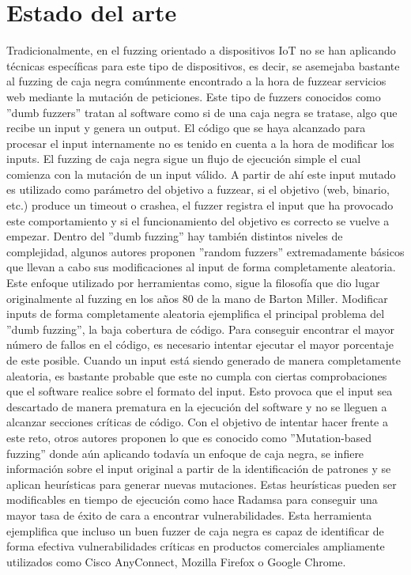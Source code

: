 \chapter{Estado del arte}
\label{estado_del_arte}
Tradicionalmente, en el fuzzing orientado a dispositivos IoT no se han aplicando técnicas
específicas para este tipo de dispositivos, es decir, se asemejaba bastante al fuzzing de caja negra 
comúnmente encontrado a la hora de fuzzear servicios web mediante la mutación de peticiones.
Este tipo de fuzzers conocidos como ''dumb fuzzers'' tratan al software como si de una caja negra se tratase, 
algo que recibe un input y genera un output. El código que se haya alcanzado para procesar el input internamente no es tenido en
cuenta a la hora de modificar los inputs. El fuzzing de caja negra sigue un flujo de ejecución simple el 
cual comienza con la mutación de un input válido.
A partir de ahí este input mutado es utilizado como parámetro del objetivo a fuzzear, si el 
objetivo (web, binario, etc.) produce un timeout o crashea, el fuzzer registra el input que 
ha provocado este comportamiento y si el funcionamiento del objetivo es correcto se vuelve a empezar. Dentro del ''dumb fuzzing'' hay también
distintos niveles de complejidad, algunos autores proponen ''random fuzzers'' extremadamente básicos que 
llevan a cabo sus modificaciones al input de forma completamente aleatoria. Este enfoque utilizado por 
herramientas como\cite{zzuf}, sigue la filosofía que dio lugar originalmente al fuzzing en 
los años 80 de la mano de Barton Miller\cite{Miller1990}. Modificar inputs de forma completamente aleatoria
ejemplifica el principal problema del ''dumb fuzzing'', la baja cobertura de código. Para conseguir encontrar 
el mayor número de fallos en el código, es necesario intentar ejecutar el mayor porcentaje de este posible. Cuando 
un input está siendo generado de manera completamente aleatoria, es bastante probable que este no cumpla con
ciertas comprobaciones que el software realice sobre el formato del input. Esto provoca que el input sea descartado 
de manera prematura en la ejecución del software y no se lleguen a alcanzar secciones críticas de código.
Con el objetivo de intentar hacer frente a este reto, otros autores proponen lo que es 
conocido como ''Mutation-based fuzzing'' donde aún aplicando todavía un enfoque de caja negra, se infiere
información sobre el input original a partir de la identificación de patrones y se aplican heurísticas para generar
nuevas mutaciones. Estas heurísticas pueden ser modificables en tiempo de ejecución como hace Radamsa\cite{radamsa}
para conseguir una mayor tasa de éxito de cara a encontrar vulnerabilidades. Esta herramienta ejemplifica que incluso 
un buen fuzzer de caja negra es capaz de identificar de forma efectiva vulnerabilidades críticas en productos comerciales 
ampliamente utilizados como Cisco AnyConnect, Mozilla Firefox o Google Chrome.

